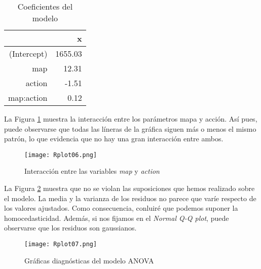 \documentclass[10pt,a4paper]{article}
\begin{document}
\begin{table}[ht]
\centering
\begin{tabular}{rr}
  \hline
 & x \\ 
  \hline
(Intercept) & 1655.03 \\ 
  map & 12.31 \\ 
  action & -1.51 \\ 
  map:action & 0.12 \\ 
   \hline
\end{tabular}
\caption{Coeficientes del modelo}
\label{table:4}
\end{table}

La Figura \ref{fig:interaccion} muestra la interacción entre los parámetros mapa y acción. Así pues, puede observarse que todas las líneras de la gráfica siguen más o menos el mismo patrón, lo que evidencia que no hay una gran interacción entre ambos.

\begin{figure}[h]
    \centering
    \texttt{[image: Rplot06.png]}
    \caption{Interacción entre las variables \emph{map} y \emph{action}}
    \label{fig:interaccion}
\end{figure}


La Figura \ref{fig:suposiciones} muestra que no se violan las suposiciones que hemos realizado sobre el modelo. La media y la varianza de los residuos no parece que varíe respecto de los valores ajustados. Como consecuencia, conluiré que podemos suponer la homocedasticidad. Además, si nos fijamos en el \emph{Normal Q-Q plot}, puede observarse que los residuos son gaussianos.

\begin{figure}[h]
    \centering
    \texttt{[image: Rplot07.png]}
    \caption{Gráficas diagnósticas del modelo ANOVA}
    \label{fig:suposiciones}
\end{figure}
\end{document}

